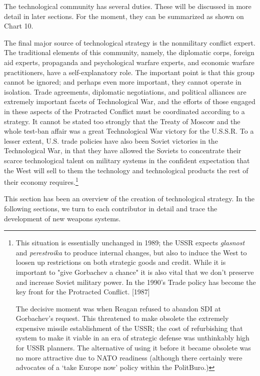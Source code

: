 The technological community has several duties. These will be discussed in more detail in later sections. For the moment, they can be summarized as shown on Chart 10.

The final major source of technological strategy is the nonmilitary conflict expert. The traditional elements of this community, namely, the diplomatic corps, foreign aid experts, propaganda and psychological warfare experts, and economic warfare practitioners, have a self-explanatory role. The important point is that this group cannot be ignored; and perhaps even more important, they cannot operate in isolation. Trade agreements, diplomatic negotiations, and political alliances are extremely important facets of Technological War, and the efforts of those engaged in these aspects of the Protracted Conflict must be coordinated according to a strategy. It cannot be stated too strongly that the Treaty of Moscow and the whole test-ban affair was a great Technological War victory for the U.S.S.R. To a lesser extent, U.S. trade policies have also been Soviet victories in the Technological War, in that they have allowed the Soviets to concentrate their scarce technological talent on military systems in the confident expectation that the West will sell to them the technology and technological products the rest of their economy requires.\footnote{This situation is essentially unchanged in 1989; the USSR expects \textit{glasnost} and \textit{perestroika} to produce internal changes, but also to induce the West to loosen up restrictions on both strategic goods and credit. While it is important to "give Gorbachev a chance" it is also vital that we don't preserve and increase Soviet military power. In the 1990's Trade policy has become the key front for the Protracted Conflict. [1987]

The decisive moment was when Reagan refused to abandon SDI at Gorbachev’s request. This threatened to make obsolete the extremely expensive missile establishment of the USSR; the cost of refurbishing that system to make it viable in an era of strategic defense was unthinkably high for USSR planners. The alternative of using it before it became obsolete was no more attractive due to NATO readiness (although there certainly were advocates of a ‘take Europe now’ policy within the PolitBuro.)}

This section has been an overview of the creation of technological strategy. In the following sections, we turn to each contributor in detail and trace the development of new weapons systems.

